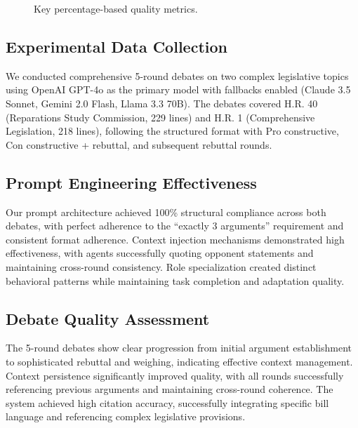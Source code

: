 \documentclass{article}
\begin{document}
\begin{figure}[t]
\centering
{}
\caption{Key percentage-based quality metrics.}
\label{fig:percentages}
\end{figure}

\subsection{Experimental Data Collection}

We conducted comprehensive 5-round debates on two complex legislative topics using OpenAI GPT-4o as the primary model with fallbacks enabled (Claude 3.5 Sonnet, Gemini 2.0 Flash, Llama 3.3 70B). The debates covered H.R. 40 (Reparations Study Commission, 229 lines) and H.R. 1 (Comprehensive Legislation, 218 lines), following the structured format with Pro constructive, Con constructive + rebuttal, and subsequent rebuttal rounds.

\subsection{Prompt Engineering Effectiveness}

Our prompt architecture achieved 100\% structural compliance across both debates, with perfect adherence to the ``exactly 3 arguments'' requirement and consistent format adherence. Context injection mechanisms demonstrated high effectiveness, with agents successfully quoting opponent statements and maintaining cross-round consistency. Role specialization created distinct behavioral patterns while maintaining task completion and adaptation quality.

\subsection{Debate Quality Assessment}

The 5-round debates show clear progression from initial argument establishment to sophisticated rebuttal and weighing, indicating effective context management. Context persistence significantly improved quality, with all rounds successfully referencing previous arguments and maintaining cross-round coherence. The system achieved high citation accuracy, successfully integrating specific bill language and referencing complex legislative provisions.
\end{document}
